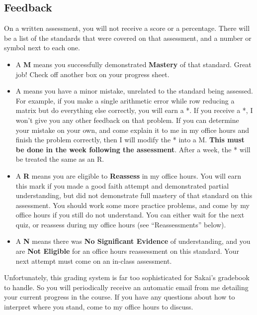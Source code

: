 \documentclass[letterpaper]{article}
\begin{document}
\subsection*{\fontsize{10}{12}\selectfont Feedback}

On a written assessment, you will not receive a score or a percentage.  There will be a list of the standards that were covered on that assessment, and a number or symbol next to each one.
\begin{itemize}
\item A {\bf M} means you successfully demonstrated {\bf Mastery} of that standard.  Great job!  Check off another box on your progress sheet.
\item A {\bf *} means you have a minor mistake, unrelated to the standard being assessed.  For example, if you make a single arithmetic error while row reducing a matrix but do everything else correctly, you will earn a *.  If you receive a *, I won't give you any other feedback on that problem.  If you can determine your mistake on your own, and come explain it to me in my office hours and finish the problem correctly, then I will modify the * into a M.  {\bf This must be done in the week following the assessment}.  After a week, the * will be treated the same as an R.
\item A {\bf R} means you are eligible to {\bf Reassess} in my office hours.  You will earn this mark if you made a good faith attempt and demonstrated partial understanding, but did not demonstrate full mastery of that standard on this assessment.  You should work some more practice problems, and come by my office hours if you still do not understand.  You can either wait for the next quiz, or reassess during my office hours (see ``Reassessments'' below).
\item A {\bf N} means there was {\bf No Significant Evidence} of understanding, and you are {\bf Not Eligible} for an office hours reassessment on this standard.  Your next attempt must come on an in-class assessment.
\end{itemize}

Unfortunately, this grading system is far too sophisticated for Sakai's gradebook to handle.  So you will periodically receive an automatic email from me detailing your current progress in the course.  If you have any questions about how to interpret where you stand, come to my office hours to discuss.
\end{document}
